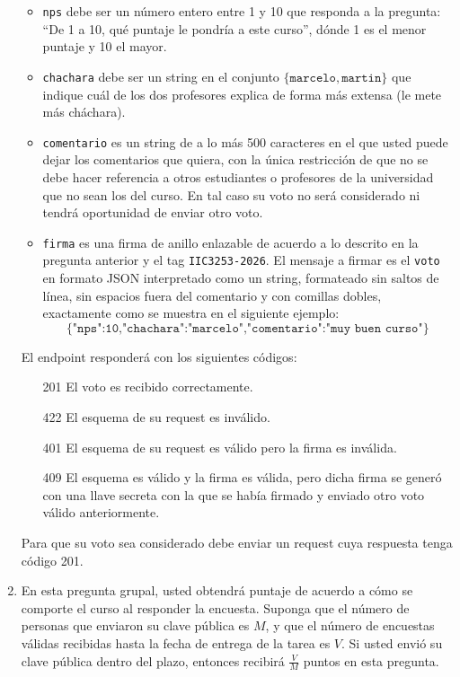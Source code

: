 \begin{enumerate}
\begin{itemize}
\item \texttt{nps} debe ser un número entero entre 1 y 10 que responda a la pregunta: ``De 1 a 10, qué puntaje le pondría a este curso'', dónde 1 es el menor puntaje y 10 el mayor.
\item \texttt{chachara} debe ser un string en el conjunto $\{\texttt{marcelo}, \texttt{martin}\}$ que indique cuál de los dos profesores explica de forma más extensa (le mete más cháchara).
\item \texttt{comentario} es un string de a lo más 500 caracteres en el que usted puede dejar los comentarios que quiera, con la única restricción de que no se debe hacer referencia a otros estudiantes o profesores de la universidad que no sean los del curso. En tal caso su voto no será considerado ni tendrá oportunidad de enviar otro voto.
\item \texttt{firma} es una firma de anillo enlazable de acuerdo a lo descrito en la pregunta anterior y el tag \texttt{IIC3253-2026}. El mensaje a firmar es el \texttt{voto} en formato JSON interpretado como un string, formateado sin saltos de línea, sin espacios fuera del comentario y con comillas dobles, exactamente como se muestra en el siguiente ejemplo:
	$$\texttt{\{"nps":10,"chachara":"marcelo","comentario":"muy buen curso"\}}$$
\end{itemize}

El endpoint responderá con los siguientes códigos:
\begin{itemize}
	\item[201] El voto es recibido correctamente.
	\item[422] El esquema de su request es inválido.
	\item[401] El esquema de su request es válido pero la firma es inválida.
	\item[409] El esquema es válido y la firma es válida, pero dicha firma se generó con una llave secreta con la que se había firmado y enviado otro voto válido anteriormente.
\end{itemize}

Para que su voto sea considerado debe enviar un request cuya respuesta tenga código 201.

\item \text{[1 punto]} En esta pregunta grupal, usted obtendrá puntaje de acuerdo a cómo se comporte el
curso al responder la encuesta. Suponga que el número de personas que enviaron su clave pública es $M$, y
que el número de encuestas válidas recibidas hasta la fecha de entrega de la tarea es $V$. Si usted
envió su clave pública dentro del plazo, entonces recibirá $\frac{V}{M}$ puntos en esta pregunta.
\end{enumerate}
